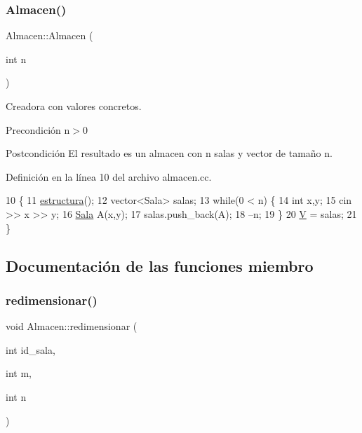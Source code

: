 \subsubsection{\texorpdfstring{Almacen()}{Almacen()}}
{\footnotesize\ttfamily Almacen\+::\+Almacen (\begin{DoxyParamCaption}\item[{int}]{n }\end{DoxyParamCaption})}



Creadora con valores concretos. 

\begin{DoxyPrecond}{Precondición}
n$>$0 
\end{DoxyPrecond}
\begin{DoxyPostcond}{Postcondición}
El resultado es un almacen con n salas y vector de tamaño n. 
\end{DoxyPostcond}


Definición en la línea 10 del archivo almacen.\+cc.


\begin{DoxyCode}
10                       \{
11   \mbox{\hyperlink{class_almacen_a184cbc0f9e316534ecc04edc0bc895f1}{estructura}}();
12   vector<Sala> salas;
13   \textcolor{keywordflow}{while}(0 < n) \{
14     \textcolor{keywordtype}{int} x,y;
15     cin >> x >> y;
16     \mbox{\hyperlink{class_sala}{Sala}} A(x,y);
17     salas.push\_back(A);
18     --n;
19   \}
20   \mbox{\hyperlink{class_almacen_a76cad3a8f2f670e26d7ceb827f7f9e69}{V}} = salas;
21 \}
\end{DoxyCode}


\subsection{Documentación de las funciones miembro}
\mbox{\label{class_almacen_a3536398091b48ede58353ad3a8a2718b}} 
\subsubsection{\texorpdfstring{redimensionar()}{redimensionar()}}
{\footnotesize\ttfamily void Almacen\+::redimensionar (\begin{DoxyParamCaption}\item[{int}]{id\+\_\+sala,  }\item[{int}]{m,  }\item[{int}]{n }\end{DoxyParamCaption})}




